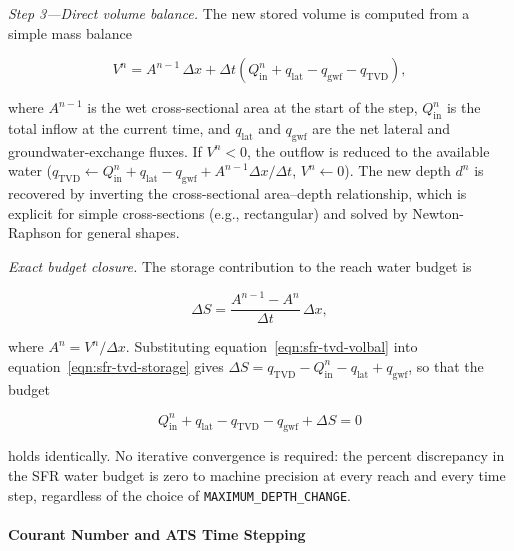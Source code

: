 \textit{Step 3---Direct volume balance.}
The new stored volume is computed from a simple mass balance

\begin{equation}
  \label{eqn:sfr-tvd-volbal}
  V^n = A^{n-1}\,\Delta x + \Delta t\!\left(Q_\mathrm{in}^n + q_\mathrm{lat} - q_\mathrm{gwf} - q_\mathrm{TVD}\right) ,
\end{equation}

\noindent where $A^{n-1}$ is the wet cross-sectional area at the start of the step, $Q_\mathrm{in}^n$ is the total inflow at the current time, and $q_\mathrm{lat}$ and $q_\mathrm{gwf}$ are the net lateral and groundwater-exchange fluxes. If $V^n < 0$, the outflow is reduced to the available water ($q_\mathrm{TVD} \gets Q_\mathrm{in}^n + q_\mathrm{lat} - q_\mathrm{gwf} + A^{n-1}\Delta x / \Delta t$, $V^n \gets 0$). The new depth $d^n$ is recovered by inverting the cross-sectional area--depth relationship, which is explicit for simple cross-sections (e.g., rectangular) and solved by Newton-Raphson for general shapes.

\textit{Exact budget closure.}
The storage contribution to the reach water budget is

\begin{equation}
  \label{eqn:sfr-tvd-storage}
  \Delta S = \frac{A^{n-1} - A^n}{\Delta t}\,\Delta x ,
\end{equation}

\noindent where $A^n = V^n / \Delta x$. Substituting equation~\ref{eqn:sfr-tvd-volbal} into equation~\ref{eqn:sfr-tvd-storage} gives $\Delta S = q_\mathrm{TVD} - Q_\mathrm{in}^n - q_\mathrm{lat} + q_\mathrm{gwf}$, so that the budget

\begin{equation}
  Q_\mathrm{in}^n + q_\mathrm{lat} - q_\mathrm{TVD} - q_\mathrm{gwf} + \Delta S = 0
\end{equation}

\noindent holds identically. No iterative convergence is required: the percent discrepancy in the SFR water budget is zero to machine precision at every reach and every time step, regardless of the choice of \texttt{MAXIMUM\_DEPTH\_CHANGE}.

\paragraph{Courant Number and ATS Time Stepping}

